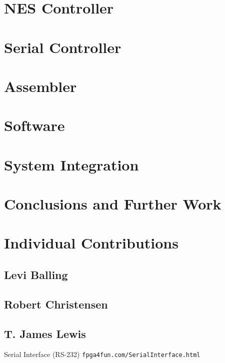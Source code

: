 \documentclass{article}
\begin{document}
\section{NES Controller}

\section{Serial Controller}

\section{Assembler}

\section{Software}

\section{System Integration}

\section{Conclusions and Further Work}

\section{Individual Contributions}

\subsection{Levi Balling}

\subsection{Robert Christensen}

\subsection{T. James Lewis}

\begin{thebibliography}{99}

 Serial Interface (RS-232) \texttt{fpga4fun.com/SerialInterface.html}

\end{thebibliography}
\end{document}
